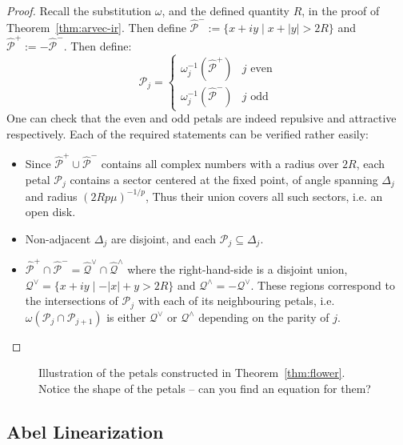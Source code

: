 \documentclass{article}
\begin{document}
\begin{proof}
    Recall the substitution $\omega$, and the defined quantity $R$, in the proof of Theorem~\ref{thm:arvec-ir}. Then define $\hat{\mathcal{P}}^-:=\{x+iy\mid x+|y|>2R\}$ and $\hat{\mathcal{P}}^+:=-\hat{\mathcal{P}}^-$. Then define:
    \begin{equation*}
        \mathcal{P}_j=
        \begin{cases} 
            \omega_j^{-1}(\hat{\mathcal{P}}^+) & j\,\,\mathrm{even} \\
            \omega_j^{-1}(\hat{\mathcal{P}}^-) & j\,\,\mathrm{odd}
        \end{cases}
    \end{equation*}
    One can check that the even and odd petals are indeed repulsive and attractive respectively. Each of the required statements can be verified rather easily:
    \begin{itemize}
        \item Since $\hat{\mathcal{P}}^+\cup\hat{\mathcal{P}}^-$ contains all complex numbers with a radius over $2R$, each petal $\mathcal{P}_j$ contains a sector centered at the fixed point, of angle spanning $\Delta_j$ and radius $(2Rp\mu)^{-1/p}$, Thus their union covers all such sectors, i.e. an open disk. 
        \item Non-adjacent $\Delta_j$ are disjoint, and each $\mathcal{P}_j\subseteq\Delta_j$. 
        \item $\hat{\mathcal{P}}^+\cap\hat{\mathcal{P}}^-=\hat{\mathcal{Q}}^\vee\cap\hat{\mathcal{Q}}^\wedge$ where the right-hand-side is a disjoint union, $\mathcal{Q}^\vee = \{x+iy\mid - |x| + y > 2R\}$ and $\mathcal{Q}^\wedge=-\mathcal{Q}^\vee$. These regions correspond to the intersections of $\mathcal{P}_j$ with each of its neighbouring petals, i.e. $\omega(\mathcal{P}_j\cap\mathcal{P}_{j+1})$ is either $\mathcal{Q}^\vee$ or $\mathcal{Q}^\wedge$ depending on the parity of $j$.
    \end{itemize}
\end{proof}

\begin{figure}
    \label{fig:petals}
    \centering
    
    \caption{Illustration of the petals constructed in Theorem~\ref{thm:flower}. Notice the shape of the petals -- can you find an equation for them?}
\end{figure}

\subsection{Abel Linearization}
\end{document}
